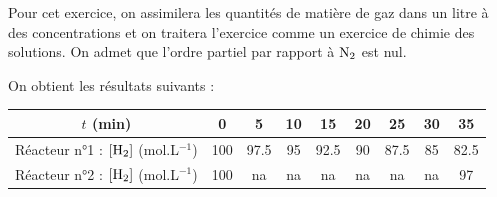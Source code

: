 \documentclass[12pt,a4paper]{article}
\begin{document}
Pour cet exercice, on assimilera les quantités de matière de gaz dans un litre à des concentrations et on traitera l'exercice comme un exercice de chimie des solutions. On admet que l'ordre partiel par rapport à $\ce{N2}$ est nul.

On obtient les résultats suivants :

\begin{center}
\begin{tabular}{|c|c|c|c|c|c|c|c|c|}
\hline
$t$ (min) & 0 & 5 & 10 & 15 & 20 & 25 & 30 & 35 \\
\hline
Réacteur n°1 : $[\ce{H2}]$ (mol.L$^{-1}$) & 100 & 97.5 & 95 & 92.5 & 90 & 87.5 & 85 & 82.5 \\
\hline
Réacteur n°2 : $[\ce{H2}]$ (mol.L$^{-1}$) & 100 & na & na & na & na & na & na & 97 \\
\hline
\end{tabular}
\end{center}
\end{document}
